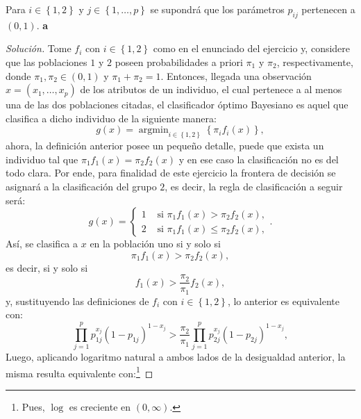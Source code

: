 \documentclass[10.5pt,notitlepage]{article}
\renewcommand{\qedsymbol}{$\blacksquare$}
\newenvironment{solucion}
  {\begin{proof}[Solución]}
  {\end{proof}}
\DeclareMathOperator{\argmin}{argmin}
\newcommand{\kis}[1]{\left\{ #1 \right\}}
\theoremstyle{plain}
\newenvironment{rem}
  {\pushQED{\qed}\renewcommand{\qedsymbol}{$\triangle$}\remarkex}
  {\popQED\endremarkex}
\begin{document}
\begin{exo}
\end{exo}
\begin{rem}
Para \(i \in \kis{1,2}\) y \(j\in\kis{1, \hdots, p}\) se supondrá que los parámetros \(p_{ij}\) pertenecen a \((0,1)\).
\end{rem}
\textbf{a}
\begin{solucion}
Tome \(f_{i}\) con \(i \in \kis{1, 2}\) como en el enunciado del ejercicio y, considere que las poblaciones \(1\) y \(2\) poseen probabilidades a priori \(\pi_1\) y \(\pi_2\), respectivamente, donde \(\pi_1, \pi_2 \in (0,1)\) y \(\pi_1 + \pi_2 = 1\). Entonces, llegada una observación \(x = (x_1, \hdots, x_p)\) de los atributos de un individuo, el cual pertenece a al menos una de las dos poblaciones citadas, el clasificador óptimo Bayesiano es aquel que clasifica a dicho individuo de la siguiente manera: 
\begin{equation*}
    g(x) = \argmin_{i \in \kis{1,2}}\kis{\pi_{i}f_{i}(x)}, 
\end{equation*}
ahora, la definición anterior posee un pequeño detalle, puede que exista un individuo tal que \(\pi_1f_{1}(x) = \pi_2f_{2}(x)\) y en ese caso la clasificación no es del todo clara. Por ende, para finalidad de este ejercicio la frontera de decisión se asignará a la clasificación del grupo \(2\), es decir, la regla de clasificación a seguir será:
\begin{equation}\label{lab.30}
    g(x) = \begin{cases}
1 & \text{ si } \pi_{1}f_{1}(x) > \pi_{2}f_{2}(x), \\ 
2 & \text{ si } \pi_{1}f_{1}(x) \leq \pi_{2}f_{2}(x), 
\end{cases}.
\end{equation}
Así, se clasifica a \(x\) en la población uno si y solo si 
\begin{equation*}
    \pi_{1}f_{1}(x) >  \pi_{2}f_{2}(x),  
\end{equation*}
es decir, si y solo si 
\begin{equation*}
    f_{1}(x) >  \frac{\pi_{2}}{\pi_{1}}f_{2}(x),  
\end{equation*}
y, sustituyendo las definiciones de \(f_{i}\) con \(i \in \kis{1,2}\), lo anterior es equivalente con: 
\begin{equation*}
    \prod_{j = 1}^{p}p_{1j}^{x_{j}} (1 - p_{1j})^{1 - x_j} >  \frac{\pi_{2}}{\pi_{1}} \prod_{j = 1}^{p}p_{2j}^{x_{j}} (1 - p_{2j})^{1 - x_j},  
\end{equation*}
Luego, aplicando logaritmo natural a ambos lados de la desigualdad anterior, la misma resulta equivalente con:\footnote{Pues, \(\log\) es creciente en \((0,\infty)\).} 

\end{solucion}
\end{document}
